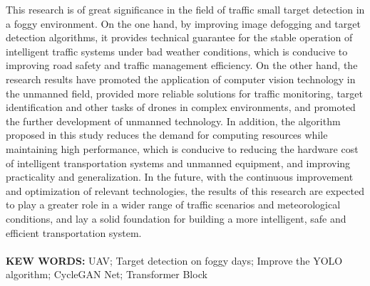\begin{enabstract}
This research is of great significance in the field of traffic small target detection in a foggy environment. On the one hand, by improving image defogging and target detection algorithms, it provides technical guarantee for the stable operation of intelligent traffic systems under bad weather conditions, which is conducive to improving road safety and traffic management efficiency. On the other hand, the research results have promoted the application of computer vision technology in the unmanned field, provided more reliable solutions for traffic monitoring, target identification and other tasks of drones in complex environments, and promoted the further development of unmanned technology. In addition, the algorithm proposed in this study reduces the demand for computing resources while maintaining high performance, which is conducive to reducing the hardware cost of intelligent transportation systems and unmanned equipment, and improving practicality and generalization. In the future, with the continuous improvement and optimization of relevant technologies, the results of this research are expected to play a greater role in a wider range of traffic scenarios and meteorological conditions, and lay a solid foundation for building a more intelligent, safe and efficient transportation system.
\\
\\
\textbf{KEW WORDS:} UAV;  Target detection on foggy days;  Improve the YOLO algorithm;  CycleGAN Net;  Transformer Block
\end{enabstract}
\pagebreak